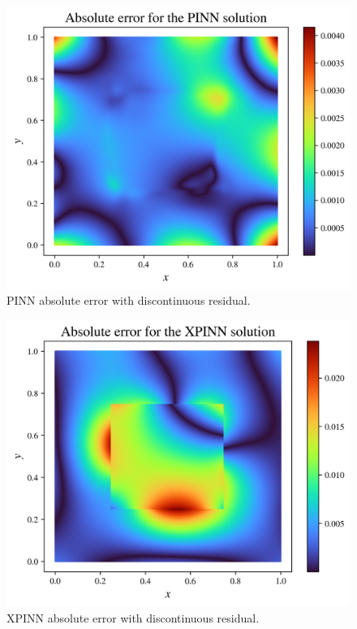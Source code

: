 \begin{figure}[h]
    \centering
    \includegraphics[width=\linewidth]{Project1XPINNs/figures/Poisson/discrete_single_Poisson_error.pdf.png}
    \caption{PINN absolute error with discontinuous residual.}
    \label{fig:pinn_disc_error}
\end{figure}

\begin{figure}[h]
    \centering
    \includegraphics[width=\linewidth]{Project1XPINNs/figures/Poisson/discrete_xpinn_Poisson_error.png}
    \caption{XPINN absolute error with discontinuous residual.}
    \label{fig:xpinn_disc_error}
\end{figure}

